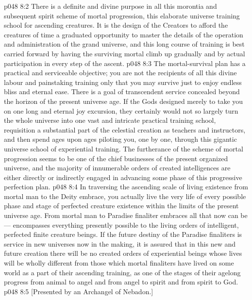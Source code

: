 \vs p048 8:2 There is a definite and divine purpose in all this morontia and subsequent spirit scheme of mortal progression, this elaborate universe training school for ascending creatures. It is the design of the Creators to afford the creatures of time a graduated opportunity to master the details of the operation and administration of the grand universe, and this long course of training is best carried forward by having the surviving mortal climb up gradually and by actual participation in every step of the ascent.
\vs p048 8:3 The mortal\hyp{}survival plan has a practical and serviceable objective; you are not the recipients of all this divine labour and painstaking training only that you may survive just to enjoy endless bliss and eternal ease. There is a goal of transcendent service concealed beyond the horizon of the present universe age. If the Gods designed merely to take you on one long and eternal joy excursion, they certainly would not so largely turn the whole universe into one vast and intricate practical training school, requisition a substantial part of the celestial creation as teachers and instructors, and then spend ages upon ages piloting you, one by one, through this gigantic universe school of experiential training. The furtherance of the scheme of mortal progression seems to be one of the chief businesses of the present organized universe, and the majority of innumerable orders of created intelligences are either directly or indirectly engaged in advancing some phase of this progressive perfection plan.
\vs p048 8:4 In traversing the ascending scale of living existence from mortal man to the Deity embrace, you actually live the very life of every possible phase and stage of perfected creature existence within the limits of the present universe age. From mortal man to Paradise finaliter embraces all that now can be --- encompasses everything presently possible to the living orders of intelligent, perfected finite creature beings. If the future destiny of the Paradise finaliters is service in new universes now in the making, it is assured that in this new and future creation there will be no created orders of experiential beings whose lives will be wholly different from those which mortal finaliters have lived on some world as a part of their ascending training, as one of the stages of their agelong progress from animal to angel and from angel to spirit and from spirit to God.
\vsetoff
\vs p048 8:5 [Presented by an Archangel of Nebadon.]
\quizlink
